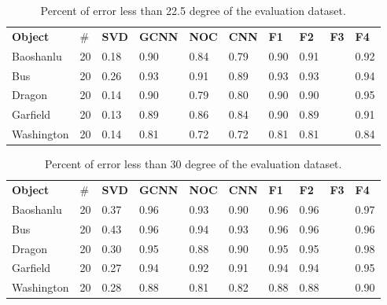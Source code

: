 \documentclass[border=15pt, multi, tikz]{article}
\newcommand{\tabhead}[1]{\textbf{#1}}
\begin{document}
\begin{table}[H]
	\centering
	\begin{tabular}{l l | l | l l l | l l l l }
		\tabhead{Object} & $ \# $ & \tabhead{SVD} & \tabhead{GCNN} & \tabhead{NOC} & \tabhead{CNN} & \tabhead{F1}& \tabhead{F2}& \tabhead{F3}& \tabhead{F4}\\
		Baoshanlu  		& 20 & 0.18 & 0.90 & 0.84 & 0.79 & 0.90 & 0.91 & & 0.92\\ 
		\hline
		Bus 			& 20 & 0.26 & 0.93 & 0.91 & 0.89 & 0.93 & 0.93 & & 0.94\\ 
		\hline
		Dragon 			& 20 & 0.14 & 0.90 & 0.79 & 0.80 & 0.90 & 0.90 & & 0.95\\
		\hline
		Garfield 		& 20 & 0.13 & 0.89 & 0.86 & 0.84 & 0.90 & 0.89 & & 0.91\\
		\hline
		Washington 		& 20 & 0.14 & 0.81 & 0.72 & 0.72 & 0.81 & 0.81 & & 0.84\\
	\end{tabular}
	\caption{Percent of error less than 22.5 degree of the evaluation dataset.}	
	\label{tab:eval-22d}
\end{table}


\begin{table}[H]
	\centering
	\begin{tabular}{l l | l | l l l | l l l l }
		\tabhead{Object} & $ \# $ & \tabhead{SVD} & \tabhead{GCNN} & \tabhead{NOC} & \tabhead{CNN} & \tabhead{F1}& \tabhead{F2}& \tabhead{F3}& \tabhead{F4}\\
		Baoshanlu  		& 20 & 0.37 & 0.96 & 0.93 & 0.90 & 0.96 & 0.96 & & 0.97 \\ 
		\hline
		Bus 			& 20 & 0.43 & 0.96 & 0.94 & 0.93 & 0.96 & 0.96 & & 0.96 \\ 
		\hline
		Dragon 			& 20 & 0.30 & 0.95 & 0.88 & 0.90 & 0.95 & 0.95 & & 0.98 \\
		\hline
		Garfield 		& 20 & 0.27 & 0.94 & 0.92 & 0.91 & 0.94 & 0.94 & & 0.95 \\
		\hline
		Washington 		& 20 & 0.28 & 0.88 & 0.81 & 0.82 & 0.88 & 0.88 & & 0.90\\
	\end{tabular}
	\caption{Percent of error less than 30 degree of the evaluation dataset.}	
	\label{tab:eval-30d}
\end{table}
\end{document}

